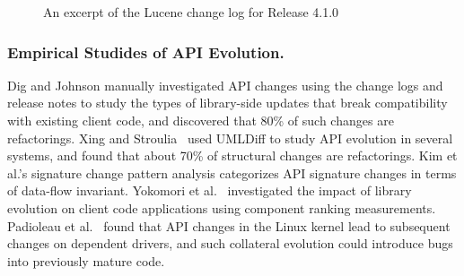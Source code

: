 \documentclass[runningheads,a4paper]{llncs}
\begin{document}
\begin{figure}
\centering
{}
\caption{An excerpt of the Lucene change log for Release 4.1.0~\cite{releasenote}}
\label{fig:releasenote}
\end{figure}

\subsubsection{Empirical Studides of API Evolution.} 
Dig and Johnson \cite{Dig'05} manually investigated API changes using the change logs and release notes to study the types of library-side updates that break compatibility with existing client code, and discovered that 80\% of such changes are refactorings. Xing and Stroulia~\cite{Xing2006:apievol} used UMLDiff to study API evolution in several systems, and found that about 70\% of structural changes are refactorings. Kim et al.'s signature change pattern analysis \cite{Kim2006:apievol} categorizes API signature changes in terms of data-flow invariant. Yokomori et al.~\cite{Yokomori2009:apiimpact} investigated the impact of library evolution on client code applications using component ranking measurements. Padioleau et al.~\cite{Padioleau2006:collateral} found that API changes in the Linux kernel lead to subsequent changes on dependent drivers, and such collateral evolution could introduce bugs into previously mature code. 
\end{document}
